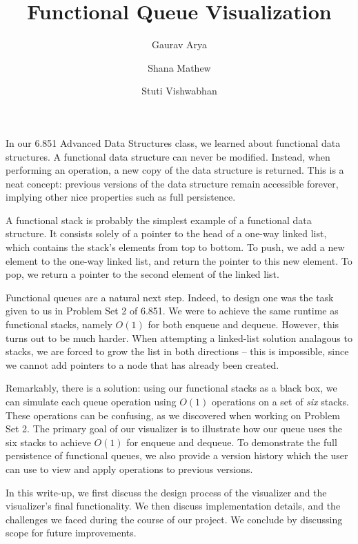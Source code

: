 \documentclass[runningheads]{llncs}
\begin{document}
%
\title{Functional Queue Visualization}
%
%
\author{Gaurav Arya \and Shana Mathew \and Stuti Vishwabhan}
%
%
%
\maketitle              %
%
%
%
%

In our 6.851 Advanced Data Structures class, we learned about functional data structures. A functional data structure can never be modified. Instead, when performing an operation, a new copy of the data structure is returned. This is a neat concept: previous versions of the data structure remain accessible forever, implying other nice properties such as full persistence.

A functional stack is probably the simplest example of a functional data structure. It consists solely of a pointer to the head of a one-way linked list, which contains the stack's elements from top to bottom. To push, we add a new element to the one-way linked list, and return the pointer to this new element. To pop, we return a pointer to the second element of the linked list. 

Functional queues are a natural next step. Indeed, to design one was the task given to us in Problem Set 2 of 6.851. We were to achieve the same runtime as functional stacks, namely $O(1)$ for both enqueue and dequeue. However, this turns out to be much harder. When attempting a linked-list solution analagous to stacks, we are forced to grow the list in both directions -- this is impossible, since we cannot add pointers to a node that has already been created. 

Remarkably, there is a solution: using our functional stacks as a black box, we can simulate each queue operation using $O(1)$ operations on a set of \emph{six} stacks. These operations can be confusing, as we discovered when working on Problem Set 2. The primary goal of our visualizer is to illustrate how our queue uses the six stacks to achieve $O(1)$ for enqueue and dequeue. To demonstrate the full persistence of functional queues, we also provide a version history which the user can use to view and apply operations to previous versions. 

In this write-up, we first discuss the design process of the visualizer and the visualizer's final functionality. We then discuss implementation details, and the challenges we faced during the course of our project. We conclude by discussing scope for future improvements. %
\end{document}
